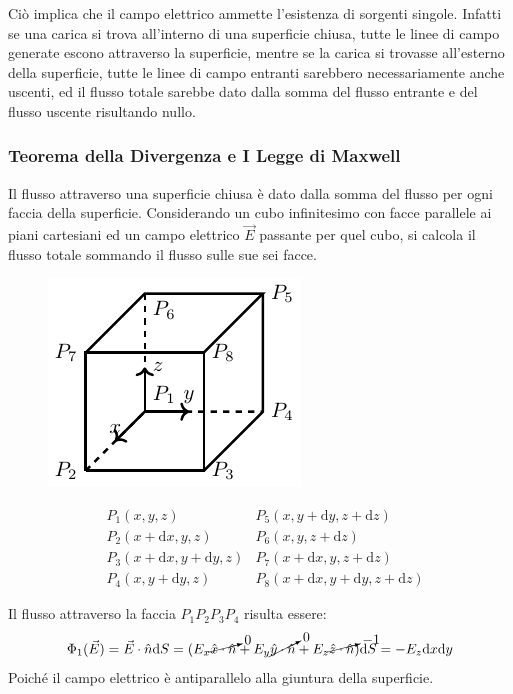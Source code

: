 \documentclass{article}
\newcommand{\df}{\mathrm{d}}
\numberwithin{equation}{subsection}
\begin{document}
Ciò implica che il campo elettrico ammette l'esistenza di sorgenti singole. Infatti se una carica si trova all'interno di una superficie chiusa, tutte le linee di campo generate 
escono attraverso la superficie, mentre se la carica si trovasse all'esterno della superficie, tutte le linee di campo entranti sarebbero necessariamente anche uscenti, ed il 
flusso totale sarebbe dato dalla somma del flusso entrante e del flusso uscente risultando nullo. 

\subsubsection{Teorema della Divergenza e I Legge di Maxwell}

Il flusso attraverso una superficie chiusa è dato dalla somma del flusso per ogni faccia della superficie. Considerando un cubo infinitesimo con facce parallele ai piani 
cartesiani ed un campo elettrico $\vec{E}$ passante per quel cubo, si calcola il flusso totale sommando il flusso sulle sue sei facce. 
\begin{figure}[H]%
    \centering
    \includegraphics{teorema-divergenza.pdf}
    \label{fig:teorema-divergenza}
\end{figure}
\begin{align*}
    &P_1(x,y,z) &P_5(x,y+\df  y,z+\df z)\\
    &P_2(x+\df  x,y,z) &P_6(x,y,z+\df z)\\
    &P_3(x+\df  x,y+\df  y,z) &P_7(x+\df  x,y,z+\df z)\\
    &P_4(x,y+\df  y,z) &P_8(x+\df  x,y+\df  y,z+\df z)
\end{align*}

Il flusso attraverso la faccia $P_1P_2P_3P_4$ risulta essere:
\begin{equation*}
    \Phi_1(\vec{E})=\vec{E}\cdot\hat{n}\df S=(E_x\cancelto{0}{\hat{x}\cdot\hat{n}}+E_y\cancelto{0}{\hat{y}\cdot\hat{n}}+E_z\cancelto{-1}{\hat{z}\cdot\hat{n}})\df S=-E_z\df x\df y
\end{equation*}
Poiché il campo elettrico è antiparallelo alla giuntura della superficie. 
\end{document}
